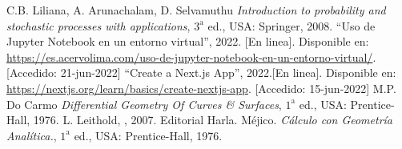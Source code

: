 \begin{thebibliography}{99}
	 C.B. Liliana, A. Arunachalam, D. Selvamuthu
	{\it Introduction to probability and stochastic processes with applications}, $3^{\text{a}}$ ed., USA: Springer, 2008.
	 ``Uso de Jupyter Notebook en un entorno virtual'', 2022. [En linea]. Disponible en: \url{https://es.acervolima.com/uso-de-jupyter-notebook-en-un-entorno-virtual/}. [Accedido: 21-jun-2022]
	 ``Create a Next.js App'', 2022.[En linea]. Disponible en: \url{https://nextjs.org/learn/basics/create-nextjs-app}. [Accedido: 15-jun-2022]
	 M.P. Do Carmo
	{\it Differential Geometry Of Curves \& Surfaces}, $1^{\text{a}}$ ed., USA: Prentice-Hall, 1976.
	 L. Leithold, , 2007.  Editorial Harla. M\'ejico. 
	{\it C\'alculo con Geometr\'ia Anal\'itica.}, $1^{\text{a}}$ ed., USA: Prentice-Hall, 1976.
\end{thebibliography} 